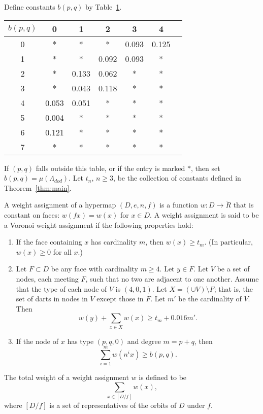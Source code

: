 Define constants $b(p,q)$ by Table~\ref{vertexTable}.
\begin{centering}
\begin{table}
\label{vertexTable}
\begin{tabular}{|c|c|c|c|c|c|c|} 
\hline
$b(p,q)$ & 0 & 1 & 2 & 3 & 4 \\
\hline
0 & * & * & * & 0.093 & 0.125  \\
1 & * & * & 0.092 & 0.093 & *  \\
2 & * & 0.133 & 0.062 & * & *  \\
3 & * & 0.043 & 0.118 & * & *  \\
4 & 0.053 & 0.051 & * & * & *  \\
5 & 0.004 & * & * & * & *  \\
6 & 0.121 & * & * & * & * \\
7 & * & * & * & * & * \\
\hline
\end{tabular}
\end{table}
\end{centering}
If $(p,q)$ falls outside this table, or if the entry is marked $*$, then
set $b(p,q)=\mu(\Lambda_{dod})$.
Let $t_n$, $n\ge3$, be the collection of constants defined in Theorem~\ref{thm:main}.

A weight assignment of a hypermap $(D,e,n,f)$ is a function $w:D \to \ring{R}$ that
is constant on faces: $w(f x) = w(x)$ for $x\in D$.  A weight assignment is said to be a Voronoi weight assignment
if the following properties hold:
\begin{enumerate}
\item If the face containing $x$ has cardinality $m$, then $w(x)\ge t_m$.
(In particular, $w(x)\ge0$ for all $x$.)
\item Let $F\subset D$ 
be any face with cardinality $m \ge 4$.  Let $y\in F$.
Let $V$ be a set of nodes, each meeting $F$, such
that no two are adjacent to one another.  
Assume that the type of each node of $V$ is $(4,0,1)$.
Let $X =(\cup V)\setminus F$;
that is, the set of darts in nodes in $V$ except those in $F$.
Let $m'$ be the cardinality of $V$.
Then
$$
w(y) + \sum_{x\in X} w(x) \ge t_m  +  0.016 m'.
$$
\item If the node of $x$ has type $(p,q,0)$ and degree $m=p+q$, then
  $$
  \sum_{i=1}^m w(n^i x) \ge b(p,q).
  $$
\end{enumerate}
The total weight of a weight assignment $w$ is defined to be
$$
\sum_{x\in [D/f]}  w(x),
$$
where $[D/f]$ is a set of representatives of the orbits of $D$ under $f$.


